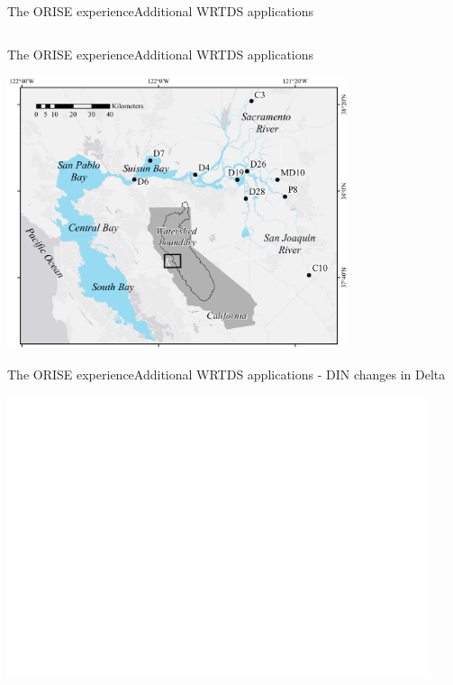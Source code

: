 \documentclass[serif]{beamer}\usepackage[]{graphicx}\usepackage[]{color}
\begin{document}
\begin{frame}{The ORISE experience}{Additional WRTDS applications}
\begin{columns}
\begin{column}{0.65\textwidth}
\end{column}
\end{columns}
\end{frame}

\begin{frame}{The ORISE experience}{Additional WRTDS applications}
\centerline{\includegraphics[width = 0.75\textwidth]{fig/delt_map.pdf}}
\end{frame}

\begin{frame}{The ORISE experience}{Additional WRTDS applications - DIN changes in Delta}
\centerline{\includegraphics[width = 0.93\textwidth, page = 2]{fig/trndsperdin.pdf}}
\end{frame}
\end{document}
